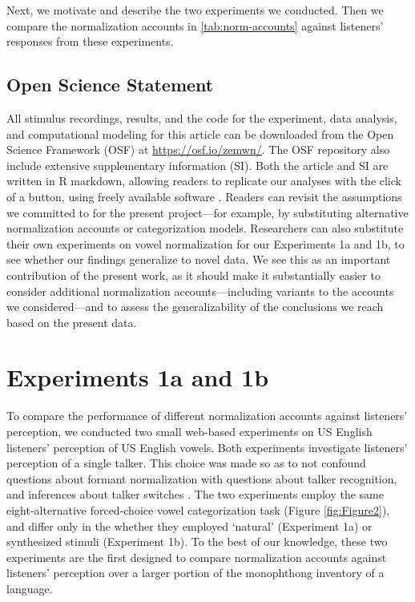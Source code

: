 \documentclass[preprint]{JASA}
\begin{document}
\linenumbers

Next, we motivate and describe the two experiments we conducted. Then
we compare the normalization accounts in %
\ref{tab:norm-accounts}
against listeners' responses from these experiments.

\subsection{Open Science Statement}\label{open-science-statement}

All stimulus recordings, results, and the code for the experiment,
data analysis, and computational modeling for this article can be
downloaded from the Open Science Framework (OSF) at
\url{https://osf.io/zemwn/}. The OSF repository also include extensive
supplementary information (SI). Both the article and SI are written in
R markdown, allowing readers to replicate our analyses with the click
of a button, using freely available software \citep{R-base, RStudio}.
Readers can revisit the assumptions we committed to for the present
project---for example, by substituting alternative normalization
accounts or categorization models. Researchers can also substitute
their own experiments on vowel normalization for our Experiments 1a
and 1b, to see whether our findings generalize to novel data. We see
this as an important contribution of the present work, as it should
make it substantially easier to consider additional normalization
accounts---including variants to the accounts we considered---and to
assess the generalizability of the conclusions we reach based on the
present data.

\section{Experiments 1a and 1b}\label{sec:experiment}

To compare the performance of different normalization accounts against listeners' perception, we conducted two small web-based experiments on US English listeners' perception of US English vowels. Both experiments investigate listeners' perception of a single talker. This choice was made so as to not confound questions about formant normalization with questions about talker recognition, and inferences about talker switches \citep{magnuson-nusbaum2007}. The two experiments employ the same eight-alternative forced-choice vowel categorization task (Figure \ref{fig:Figure2}), and differ only in the whether they employed `natural' (Experiment 1a) or synthesized stimuli (Experiment 1b). To the best of our knowledge, these two experiments are the first designed to compare normalization accounts against listeners' perception over a larger portion of the monophthong inventory of a language.
\end{document}
